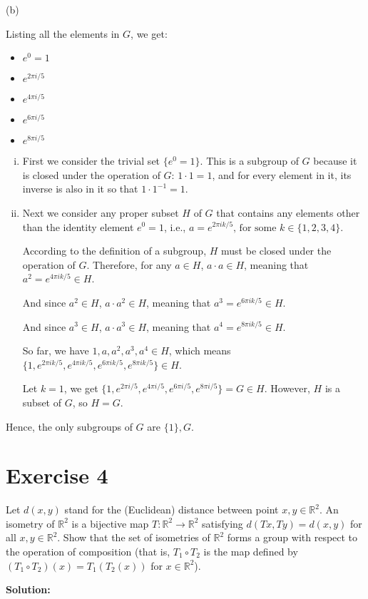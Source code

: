 \documentclass{article}
\begin{document}
(b)

Listing all the elements in $G$, we get:

\begin{itemize}
\item $e^0 = 1$
\item $e^{2\pi i/5}$
\item $e^{4\pi i/5}$
\item $e^{6\pi i/5}$
\item $e^{8\pi i/5}$
\end{itemize}

\begin{enumerate}[(i)]
\item First we consider the trivial set $\{e^0 = 1\}$. This is a subgroup of $G$ because it is closed under the operation of $G$: $1 \cdot 1 = 1$, and for every element in it, its inverse is also in it so that $1 \cdot 1^{-1} = 1$.

\item Next we consider any proper subset $H$ of $G$ that contains any elements other than the identity element $e^0 = 1$, i.e., $a = e^{2\pi i k/5} \text{, for some } k \in \{1,2,3,4\}$.

According to the definition of a subgroup, $H$ must be closed under the operation of $G$. Therefore, for any $a \in H$, $a \cdot a \in H$, meaning that $a^2 = e^{4\pi i k/5} \in H$.

And since $a^2 \in H$, $a \cdot a^2 \in H$, meaning that $a^3 = e^{6\pi i k/5} \in H$.

And since $a^3 \in H$, $a \cdot a^3 \in H$, meaning that $a^4 = e^{8\pi i k/5} \in H$.

So far, we have $1, a, a^2, a^3, a^4 \in H$, which means $\{1, e^{2\pi i k/5}, e^{4\pi i k/5}, e^{6\pi i k/5}, e^{8\pi i k/5}\} \in H$.

Let $k=1$, we get $\{1, e^{2\pi i/5}, e^{4\pi i/5}, e^{6\pi i/5}, e^{8\pi i/5}\} = G \in H$. However, $H$ is a subset of $G$, so $H=G$.

\end{enumerate}

Hence, the only subgroups of $G$ are $\{1\}, G$.

\newpage

\section*{Exercise 4}

Let $d(x,y)$ stand for the (Euclidean) distance between point $x,y \in \mathbb{R}^2$. An isometry of $\mathbb{R}^2$ is a bijective map $T: \mathbb{R}^2 \to \mathbb{R}^2$ satisfying $d(Tx,Ty)=d(x,y)$ for all $x,y \in \mathbb{R}^2$. Show that the set of isometries of $\mathbb{R}^2$ forms a group with respect to the operation of composition (that is, $T_1 \circ T_2$ is the map defined by $(T_1 \circ T_2)(x)=T_1(T_2(x))$ for $x \in \mathbb{R}^2$).

\textbf{Solution:}
\end{document}
